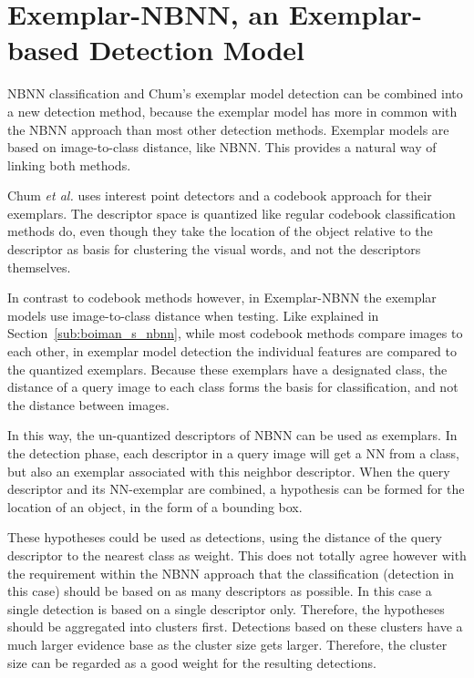 
\chapter{Exemplar-NBNN, an Exemplar-based Detection Model} %
\label{cha:linking}

NBNN classification and Chum's exemplar model detection \cite{chum2007exemplar} can be combined into a new detection method, because the exemplar model has more in common with the NBNN approach than most other detection methods. Exemplar models are based on image-to-class distance, like NBNN. This provides a natural way of linking both methods.

Chum \emph{et al.}\cite{chum2007exemplar} uses interest point detectors and a codebook approach for their exemplars. The descriptor space is quantized like regular codebook classification methods do, even though they take the location of the object relative to the descriptor as basis for clustering the visual words, and not the descriptors themselves.

In contrast to codebook methods however, in Exemplar-NBNN the exemplar models use image-to-class distance when testing. Like explained in Section~\ref{sub:boiman_s_nbnn}, while most codebook methods compare images to each other, in exemplar model detection the individual features are compared to the quantized exemplars. Because these exemplars have a designated class, the distance of a query image to each class forms the basis for classification, and not the distance between images.

In this way, the un-quantized descriptors of NBNN can be used as exemplars. In the detection phase, each descriptor in a query image will get a NN from a class, but also an exemplar associated with this neighbor descriptor. When the query descriptor and its NN-exemplar are combined, a hypothesis can be formed for the location of an object, in the form of a bounding box.

These hypotheses could be used as detections, using the distance of the query descriptor to the nearest class as weight. This does not totally agree however with the requirement within the NBNN approach that the classification (detection in this case) should be based on as many descriptors as possible. In this case a single detection is based on a single descriptor only. Therefore, the hypotheses should be aggregated into clusters first. Detections based on these clusters have a much larger evidence base as the cluster size gets larger. Therefore, the cluster size can be regarded as a good weight for the resulting detections.

